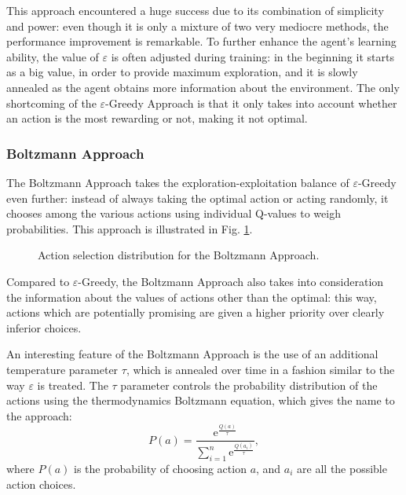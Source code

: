 \documentclass[a4paper, 12pt]{article}
\numberwithin{equation}{section}
\begin{document}
This approach encountered a huge success due to its combination of simplicity and power: even though it is only a mixture of two very mediocre methods, the performance improvement is remarkable. To further enhance the agent's learning ability, the value of $\varepsilon$ is often adjusted during training: in the beginning it starts as a big value, in order to provide maximum exploration, and it is slowly annealed as the agent obtains more information about the environment. The only shortcoming of the $\varepsilon$-Greedy Approach is that it only takes into account whether an action is the most rewarding or not, making it not optimal.


\subsubsection{Boltzmann Approach}

The Boltzmann Approach takes the exploration-exploitation balance of $\varepsilon$-Greedy even further: instead of always taking the optimal action or acting randomly, it chooses among the various actions using individual Q-values to weigh probabilities. This approach is illustrated in Fig. \ref{fig:boltzmann}.


\begin{figure}[h]
	\centering
		\caption{Action selection distribution for the Boltzmann Approach.}
	\label{fig:boltzmann}
\end{figure}

Compared to $\varepsilon$-Greedy, the Boltzmann Approach also takes into consideration the information about the values of actions other than the optimal: this way, actions which are potentially promising are given a higher priority over clearly inferior choices.

An interesting feature of the Boltzmann Approach is the use of an additional temperature parameter $\tau$, which is annealed over time in a fashion similar to the way $\varepsilon$ is treated. The $\tau$ parameter controls the probability distribution of the actions using the thermodynamics Boltzmann equation, which gives the name to the approach:
\begin{equation}\label{eq:boltzmann}
	P\left(a\right) = \frac{\mathrm{e}^\frac{Q\left(a\right)}{\tau}}{\sum_{i=1}^n \mathrm{e}^\frac{Q\left(a_i\right)}{\tau}},
\end{equation}
where $P\left(a\right)$ is the probability of choosing action $a$, and $a_i$ are all the possible action choices.
\end{document}
